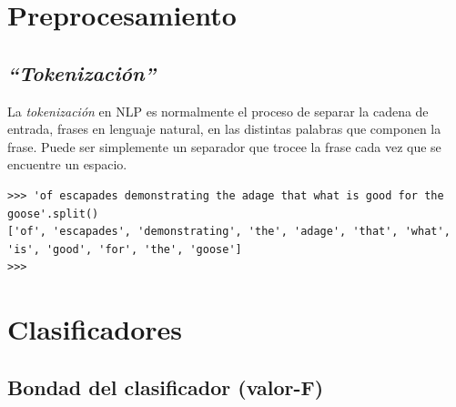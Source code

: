 
\section{Preprocesamiento}

\subsection[Tokenización]{\emph{``Tokenización''}}

La \emph{tokenización} en NLP es normalmente el proceso de separar la cadena de entrada, frases en lenguaje natural, en las distintas palabras que componen la frase. Puede ser simplemente un separador que trocee la frase cada vez que se encuentre un espacio.
\begin{verbatim}
>>> 'of escapades demonstrating the adage that what is good for the goose'.split()
['of', 'escapades', 'demonstrating', 'the', 'adage', 'that', 'what', 'is', 'good', 'for', 'the', 'goose']
>>> 
\end{verbatim}


\section{Clasificadores}

\subsection{Bondad del clasificador (valor-F)}


